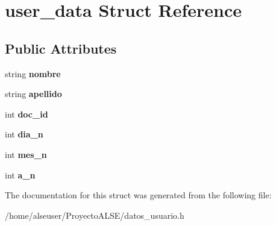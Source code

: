 \hypertarget{structuser__data}{}\section{user\+\_\+data Struct Reference}
\label{structuser__data}
\subsection*{Public Attributes}
\begin{DoxyCompactItemize}
\item 
\mbox{\label{structuser__data_aacb4d4adab0081206fb60e06ae6ce0f0}} 
string {\bfseries nombre}
\item 
\mbox{\label{structuser__data_a2c96e3aebe0fb4cc1ce25bf4de404924}} 
string {\bfseries apellido}
\item 
\mbox{\label{structuser__data_a200b6c316439f7cb74788cb953a4d8bd}} 
int {\bfseries doc\+\_\+id}
\item 
\mbox{\label{structuser__data_ae4e769d36f8db851b28de099dd887fdd}} 
int {\bfseries dia\+\_\+n}
\item 
\mbox{\label{structuser__data_a7bde41ebb95c5bd69d2986060db8d97e}} 
int {\bfseries mes\+\_\+n}
\item 
\mbox{\label{structuser__data_a892d15908af2f7ac45b2027ebfedf41c}} 
int {\bfseries a\+\_\+n}
\end{DoxyCompactItemize}


The documentation for this struct was generated from the following file\+:\begin{DoxyCompactItemize}
\item 
/home/alseuser/\+Proyecto\+A\+L\+S\+E/datos\+\_\+usuario.\+h\end{DoxyCompactItemize}
